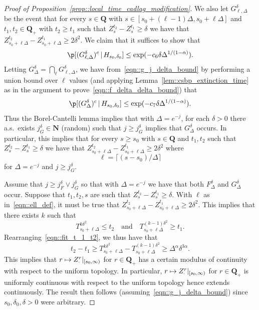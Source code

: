 \documentclass[10pt]{amsart}
\newcommand\mto{\mathchoice{\longmapsto}{\mapsto}{\mapsto}{\mapsto}}
\theoremstyle{plain}
\numberwithin{theorem}{section}
\theoremstyle{definition}
\newcommand{\N}{\mathbf{N}}
\newcommand{\Q}{{\mathbf Q}}
\newcommand{\giv}{\,|\,}
\begin{document}
\begin{proof}[Proof of Proposition~\ref{prop::local_time_cadlag_modification}]
We also let $G_{\ell,\Delta}^{\delta}$ be the event that for every $s \in \Q$ with $s \in [s_0 + (\ell-1) \Delta,s_0 + \ell\Delta]$ and $t_1,t_2 \in \Q_+$ with $t_2 \geq t_1$ such that $Z_s^{t_2} - Z_s^{t_1} \geq \delta$ we have that $Z_{s_0 + \ell \Delta}^{t_2} - Z_{s_0 + \ell \Delta}^{t_1} \geq 2\delta^2$. We claim that it suffices to show that
\begin{equation}
\label{eqn::g_j_delta_bound}
\p[ (G_{\ell,\Delta}^{\delta})^c \giv H_{s_0,\delta_0}] \leq \exp(-c_6 \delta \Delta^{1/(1-\alpha)}).
\end{equation}
Letting $G_\Delta^{\delta} = \bigcap_\ell G_{\ell,\Delta}^{\delta}$, we have from~\eqref{eqn::g_j_delta_bound} by performing a union bound over $\ell$ values (and applying Lemma~\ref{lem::csbp_extinction_time} as in the argument to prove~\eqref{eqn::f_delta_delta_bound}) that
\[
\p[ (G_\Delta^\delta)^c \giv H_{s_0,\delta_0}] \leq \exp(-c_7 \delta \Delta^{1/(1-\alpha)}).
\]
Thus the Borel-Cantelli lemma implies that with $\Delta = e^{-j}$, for each $\delta > 0$ there a.s.\ exists $j_G^\delta \in \N$ (random) such that $j \geq j_G^\delta$ implies that $G_\Delta^\delta$ occurs. In particular, this implies that for every $s \geq s_0$ with $s \in \Q$ and $t_1,t_2$ such that $Z_s^{t_2} - Z_s^{t_1} \geq \delta$ we have that $Z_{s_0 + \ell \Delta}^{t_2} - Z_{s_0 + \ell\Delta}^{t_1} \geq 2\delta^2$ where\vspace*{-3pt}
\begin{equation}
\label{eqn::ell_def}
\ell = \lceil (s-s_0)/\Delta \rceil
\end{equation}
for $\Delta = e^{-j}$ and $j \geq j_G^\delta$.

Assume that $j \geq j_F^\delta \vee j_G^\delta$ so that with $\Delta = e^{-j}$ we have that both $F_\Delta^\delta$ and $G_\Delta^\delta$ occur. Suppose that $t_1,t_2,s$ are such that $Z_s^{t_2} - Z_s^{t_1} \geq \delta$. With $\ell$ as in~\eqref{eqn::ell_def}, it must be true that $Z_{s_0 + \ell \Delta}^{t_2} - Z_{s_0 + \ell \Delta}^{t_1} \geq 2\delta^2$. This implies that there exists $k$ such that\vspace*{-3pt}
\begin{equation}
\label{eqn::fit_t_1_t2}
T_{s_0 + \ell \Delta}^{k \delta^2} \leq t_2 \quad\text{and}\quad T_{s_0 + \ell \Delta}^{(k-1) \delta^2} \geq t_1.
\end{equation}
Rearranging~\eqref{eqn::fit_t_1_t2}, we thus have that\vspace*{-3pt}
\begin{equation}
\label{eqn::t_2_t_1_diff_bound}
t_2 - t_1 \geq T_{s_0 + \ell \Delta}^{k \delta^2} - T_{s_0 + \ell \Delta}^{(k-1) \delta^2} \geq \Delta^\alpha \delta^{3\alpha}.
\end{equation}
This implies that $r \mto Z_\cdot^r|_{[s_0,\infty)}$ for $r \in \Q_+$ has a certain modulus of continuity with respect to the uniform topology. In particular, $r \mto Z_\cdot^r|_{[s_0,\infty)}$ for $r \in \Q_+$ is uniformly continuous with respect to the uniform topology hence extends continuously. The result then follows (assuming~\eqref{eqn::g_j_delta_bound}) since $s_0,\delta_0,\delta > 0$ were arbitrary.


\end{proof}
\end{document}

